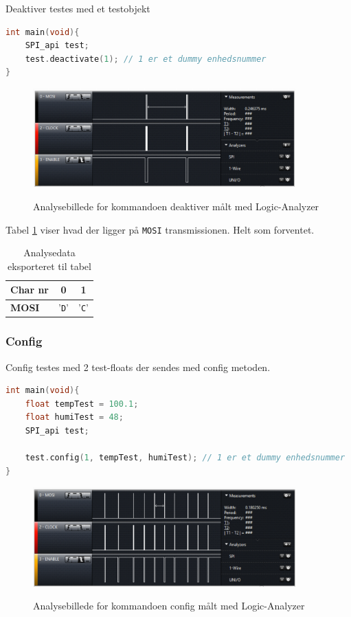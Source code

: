 Deaktiver testes med et testobjekt

\begin{lstlisting}[language=C]
int main(void){
	SPI_api test;
	test.deactivate(1); // 1 er et dummy enhedsnummer
}
\end{lstlisting}

\begin{figure}[H]
\centering
{\includegraphics[width=0.90\textwidth]{filer/modultest/Billeder/mt_deactivate}}
\caption{Analysebillede for kommandoen deaktiver målt med Logic-Analyzer}
\label{lab:mt_deactivate}
\end{figure}

Tabel \ref{table:mt_deactivate} viser hvad der ligger på \verb+MOSI+ transmissionen. Helt som forventet.

\begin{table}[h]
	\caption{Analysedata eksporteret til tabel}
	\centering
	\begin{tabular}{|l|c|c|}
		\hline 
		\textbf{Char nr} & \textbf{0} & \textbf{1} \\ 		
		\hline 
		\textbf{MOSI} & '\verb+D+' & '\verb+C+' \\ 
		\hline 
	\end{tabular} 
	\label{table:mt_deactivate}
\end{table}


\subsubsection*{Config}
Config testes med 2 test-floats der sendes med config metoden.

\begin{lstlisting}[language=C]
int main(void){
	float tempTest = 100.1;
	float humiTest = 48;
	SPI_api test;
	
	test.config(1, tempTest, humiTest); // 1 er et dummy enhedsnummer
}
\end{lstlisting}

\begin{figure}[H]
\centering
{\includegraphics[width=0.90\textwidth]{filer/modultest/Billeder/mt_config}}
\caption{Analysebillede for kommandoen config målt med Logic-Analyzer}
\label{lab:mt_config}
\end{figure}

